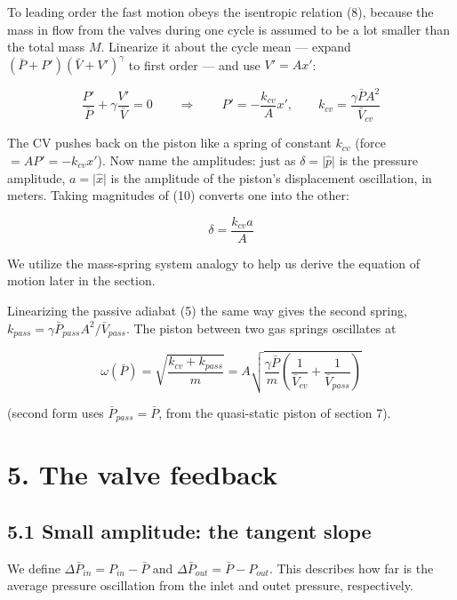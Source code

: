 \documentclass[11pt]{article}
\begin{document}
To leading order the fast motion obeys the isentropic relation (8), because the mass in flow from the valves during one cycle is assumed to be a lot smaller than the total mass $M$. Linearize it about the cycle mean --- expand $(\bar P + P')(\bar V + V')^\gamma$ to first order --- and use $V' = Ax'$:

\begin{equation}
\frac{P'}{\bar P} + \gamma\frac{V'}{\bar V} = 0 \qquad\Longrightarrow\qquad P' = -\frac{k_{cv}}{A}x', \qquad k_{cv} = \frac{\gamma\bar PA^2}{\bar V_{cv}} \tag{10}
\end{equation}

The CV pushes back on the piston like a spring of constant $k_{cv}$ (force $= AP' = -k_{cv}x'$). Now name the amplitudes: just as $\delta = \lvert\hat p\rvert$ is the pressure amplitude, $a = \lvert\hat x\rvert$ is the amplitude of the piston's displacement oscillation, in meters. Taking magnitudes of (10) converts one into the other:

\begin{equation}
\delta = \frac{k_{cv}a}{A} \tag{11}
\end{equation}

We utilize the mass-spring system analogy to help us derive the equation of motion later in the section. 

Linearizing the passive adiabat (5) the same way gives the second spring, $k_{pass} = \gamma\bar P_{pass}A^2/\bar V_{pass}$. The piston between two gas springs oscillates at

\begin{equation}
\omega(\bar P) = \sqrt{\frac{k_{cv}+k_{pass}}{m}} = A\sqrt{\frac{\gamma\bar P}{m}\left(\frac{1}{\bar V_{cv}} + \frac{1}{\bar V_{pass}}\right)} \tag{12}
\end{equation}

(second form uses $\bar P_{pass} = \bar P$, from the quasi-static piston of section 7). 

\section*{5. The valve feedback}

\subsection*{5.1 Small amplitude: the tangent slope}

We define $\Delta\bar P_{in} = P_{in} - \bar P$ and $\Delta\bar P_{out} = \bar P - P_{out}$. This describes how far is the average pressure oscillation from the inlet and outet pressure, respectively. 
\end{document}
